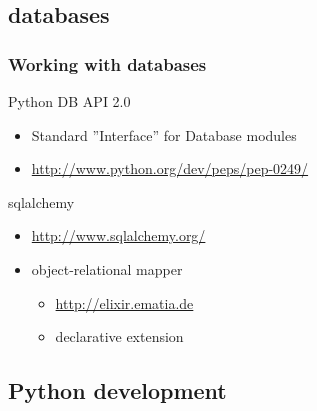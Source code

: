 \documentclass{beamer}
\begin{document}
\subsection*{databases}
\begin{frame}
	\frametitle{Working with databases}
	\begin{block}{Python DB API 2.0}
	\begin{itemize}
		\item Standard ''Interface'' for Database modules
		\item \url{http://www.python.org/dev/peps/pep-0249/}
	\end{itemize}
	\end{block}
	
	\begin{block}{sqlalchemy}
	\begin{itemize}
		\item \url{http://www.sqlalchemy.org/}
		\item object-relational mapper
		\begin{itemize}
			\item \url{http://elixir.ematia.de}
			\item declarative extension
		\end{itemize}
	\end{itemize}
	\end{block}
\end{frame}

\subsection*{Python development}
\end{document}
